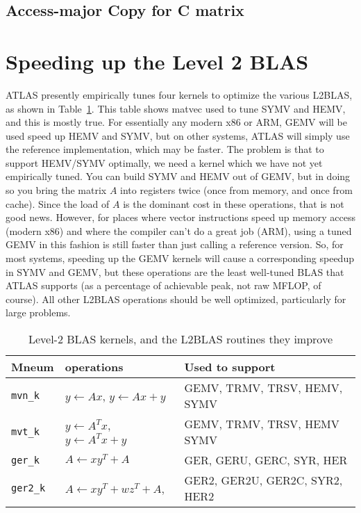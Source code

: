 \documentclass[11pt]{article}
\newcommand{\kernk}[1]{{\tt #1\_k}}
\begin{document}
\subsection{Access-major Copy for C matrix}

\newpage
\section{Speeding up the Level 2 BLAS}

ATLAS presently empirically tunes four kernels to optimize the various
L2BLAS, as shown in Table~\ref{tab-l2k}.
This table shows matvec used to tune SYMV and HEMV, and this is mostly
true.  For essentially any modern x86 or ARM, GEMV will be used speed up
HEMV and SYMV, but on other systems, ATLAS will simply use the reference
implementation, which may be faster.  The problem is that to support
HEMV/SYMV optimally, we need a kernel which we have not yet
empirically tuned.  You can build SYMV and HEMV out of GEMV, but in
doing so you bring the matrix $A$ into registers twice (once from
memory, and once from cache).  Since the load of $A$ is the dominant
cost in these operations, that is not good news.  However, for places
where vector instructions speed up memory access (modern x86) and where
the compiler can't do a great job (ARM), using a tuned GEMV in this
fashion is still faster than just calling a reference version.  So,
for most systems, speeding up the GEMV kernels will cause a corresponding
speedup in SYMV and GEMV, but these operations are the least well-tuned
BLAS that ATLAS supports (as a percentage of achievable peak, not raw
MFLOP, of course).  All other L2BLAS operations should be well optimized,
particularly for large problems.


\begin{table}[thb]
\begin{center}
\begin{tabular}{lll}
Mneum & operations & Used to support \\\hline\hline
\kernk{mvn} & $y \leftarrow Ax$, $y \leftarrow Ax + y$ & GEMV, TRMV, TRSV, 
HEMV, SYMV\\\hline
\kernk{mvt} & $y \leftarrow A^Tx$, $y \leftarrow A^Tx + y$ & GEMV, TRMV, TRSV,
HEMV SYMV\\\hline
\kernk{ger} & $A \leftarrow xy^T + A$  & GER, GERU, GERC, SYR, HER \\\hline
\kernk{ger2}& $A \leftarrow xy^T + wz^T + A$, & GER2, GER2U, GER2C, SYR2, HER2
\\\hline
\end{tabular}
\end{center}
\caption{Level-2 BLAS kernels, and the L2BLAS routines they improve}
\label{tab-l2k}
\end{table}
\end{document}
